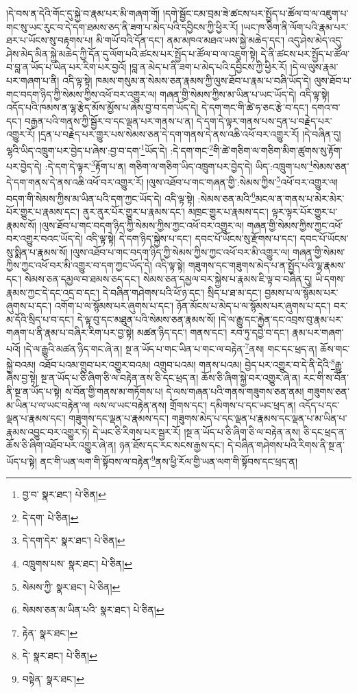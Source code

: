 །དེ་བས་ན་དེའི་གོང་དུ་སྐྱེ་བ་རྣམ་པར་མི་གཞག་གོ། །དགེ་སྦྱོང་ངམ་བྲམ་ཟེ་ཚངས་པར་སྤྱོད་པ་ཚོལ་བ་ལ་འཇུག་པ་གང་སུ་ཡང་རུང་བ་དེ་དག་ཐམས་ཅད་ནི་ཟག་པ་མེད་པའི་དབྱིངས་ཀྱི་ཕྱིར་རོ། །ཡང་ཁ་ཅིག་ནི་ལོག་པའི་རྣམ་པར་ཐར་པ་ཡོངས་སུ་བརྟགས་པ། མི་གཡོ་བའི་དོན་དང་། ནམ་མཁའ་མཐའ་ཡས་སྐྱེ་མཆེད་དང་། འདུ་ཤེས་མེད་འདུ་ཤེས་མེད་མིན་སྐྱེ་མཆེད་ཀྱི་དོན་དུ་ལོག་པའི་ཚངས་པར་སྤྱོད་པ་ཚོལ་བ་ལ་འཇུག་སྟེ། དེ་ནི་ཚངས་པར་སྤྱོད་པ་ཚོལ་བ་བླ་ན་ཡོད་པ་ཡིན་པར་རིག་པར་བྱའོ། །བླ་ན་མེད་པ་ནི་ཟག་པ་མེད་པའི་དབྱིངས་ཀྱི་ཕྱིར་རོ། །དེ་ལ་ལུས་རྣམ་པར་གཞག་པ་ནི། འདི་ལྟ་སྟེ། ཁམས་གསུམ་ན་སེམས་ཅན་རྣམས་ཀྱི་ལུས་ཐོབ་པ་རྣམ་པ་བཞི་ཡོད་དེ། ལུས་ཐོབ་པ་གང་བདག་ཉིད་ཀྱི་སེམས་ཀྱིས་འཕོ་བར་འགྱུར་ལ། གཞན་གྱི་སེམས་ཀྱིས་མ་ཡིན་པ་ཡང་ཡོད་དེ། འདི་ལྟ་སྟེ། འདོད་པའི་ཁམས་ན་ལྷ་རྩེད་མོས་མྱོས་པ་ཞེས་བྱ་བ་དག་ཡོད་དེ། དེ་དག་གང་གི་ཚེ་ཧ་ཅང་རྩེ་བ་དང་། དགའ་བ་དང་། བརྒྱན་པའི་གནས་ཀྱི་སྦྱོར་བ་དང་ལྡན་པར་གནས་པ་ན། དེ་དག་དེ་ལྟར་གནས་པས་དྲན་པ་བརྗེད་པར་འགྱུར་རོ། །དྲན་པ་བརྗེད་པར་གྱུར་པས་སེམས་ཅན་དེ་དག་གནས་དེ་ནས་འཆི་འཕོ་བར་འགྱུར་རོ། །དེ་བཞིན་དུ། ལྷའི་ཡིད་འཁྲུག་པར་བྱེད་པ་ཞེས་:བྱ་བ་དག་\footnote{བྱ་བ་  སྣར་ཐང་།  པེ་ཅིན། }ཡོད་དེ། :དེ་དག་གང་\footnote{དེ་དག་  པེ་ཅིན། }གི་ཚེ་གཅིག་ལ་གཅིག་མིག་ཚུགས་སུ་རྟོག་པར་བྱེད་དེ། :དེ་དག་དེ་ལྟར་\footnote{དེ་དག་དེར་  སྣར་ཐང་།  པེ་ཅིན། }རྟོག་པ་ན། གཅིག་ལ་གཅིག་ཡིད་འཁྲུག་པར་བྱེད་དེ། ཡིད་:འཁྲུག་པས་\footnote{འཁྲུགས་པས་  སྣར་ཐང་།  པེ་ཅིན། }སེམས་ཅན་དེ་དག་གནས་དེ་ནས་འཆི་འཕོ་བར་འགྱུར་རོ། །ལུས་འཐོབ་པ་གང་གཞན་གྱི་:སེམས་ཀྱིས་\footnote{སེམས་ཀྱི་  སྣར་ཐང་།  པེ་ཅིན། }འཕོ་བར་འགྱུར་ལ། བདག་གི་སེམས་ཀྱིས་མ་ཡིན་པའི་དག་ཀྱང་ཡོད་དེ། འདི་ལྟ་སྟེ། :སེམས་ཅན་མའི་\footnote{སེམས་ཅན་མ་ཡིན་པའི་  སྣར་ཐང་།  པེ་ཅིན། }མངལ་ན་གནས་པ་མེར་མེར་པོར་གྱུར་པ་རྣམས་དང་། ནུར་ནུར་པོར་གྱུར་པ་རྣམས་དང་། མཁྲང་གྱུར་པ་རྣམས་དང་། ལྟར་ལྟར་པོར་གྱུར་པ་རྣམས་སོ། །ལུས་ཐོབ་པ་གང་བདག་ཉིད་ཀྱི་སེམས་ཀྱིས་ཀྱང་འཕོ་བར་འགྱུར་ལ། གཞན་གྱི་སེམས་ཀྱིས་ཀྱང་འཕོ་བར་འགྱུར་བའང་ཡོད་དེ། འདི་ལྟ་སྟེ། དེ་དག་ཉིད་སྐྱེས་པ་དང་། དབང་པོ་ཡོངས་སུ་རྫོགས་པ་དང་། དབང་པོ་ཡོངས་སུ་སྨིན་པ་རྣམས་སོ། །ལུས་འཐོབ་པ་གང་བདག་ཉིད་ཀྱི་སེམས་ཀྱིས་ཀྱང་འཕོ་བར་མི་འགྱུར་ལ། གཞན་གྱི་སེམས་ཀྱིས་ཀྱང་འཕོ་བར་མི་འགྱུར་བ་དག་ཀྱང་ཡོད་དེ། འདི་ལྟ་སྟེ། གཟུགས་དང་གཟུགས་མེད་པ་ན་སྤྱོད་པའི་ལྷ་རྣམས་དང་། སེམས་ཅན་དམྱལ་བ་ཐམས་ཅད་དང་། སེམས་ཅན་དམྱལ་བར་སྐྱེས་པ་རྣམས་ཇི་ལྟ་བ་བཞིན་དུ། ཡི་དགས་རྣམས་ཀྱང་དེ་དང་འདྲ་བ་དང་། དེ་བཞིན་གཤེགས་པའི་ཕོ་ཉ་དང་། སྲིད་པ་ཐ་མ་དང་། བྱམས་པ་ལ་སྙོམས་པར་ཞུགས་པ་དང་། འགོག་པ་ལ་སྙོམས་པར་ཞུགས་པ་དང་། ཉོན་མོངས་པ་མེད་པ་ལ་སྙོམས་པར་ཞུགས་པ་དང་། བར་མ་དོའི་སྲིད་པ་བ་དང་། དེ་ལྟ་བུ་དང་མཐུན་པའི་སེམས་ཅན་རྣམས་སོ། །དེ་ལ་རྒྱུ་དང་རྐྱེན་དང་འབྲས་བུ་རྣམ་པར་གཞག་པ་ནི་རྣམ་པ་བཞིར་རིག་པར་བྱ་སྟེ། མཚན་ཉིད་དང་། གནས་དང་། རབ་ཏུ་དབྱེ་བ་དང་། རྣམ་པར་གཞག་པའོ། །དེ་ལ་རྒྱུའི་མཚན་ཉིད་གང་ཞེ་ན། སྔ་ན་ཡོད་པ་གང་ཡིན་པ་གང་ལ་བརྟེན་\footnote{རྟེན་  སྣར་ཐང་། }ནས། གང་དང་ཕྲད་ན། ཆོས་གང་སྐྱེ་བའམ། འཐོབ་པའམ་གྲུབ་པར་འགྱུར་བའམ། འགྲུབ་པའམ། གནས་པའམ། བྱེད་པར་འགྱུར་བ་དེ་ནི་དེའི་\footnote{དེ་  སྣར་ཐང་།  པེ་ཅིན། }རྒྱུ་ཞེས་བྱ་སྟེ། སྔ་ན་ཡོད་པ་ཅི་ཞིག་ཅི་ལ་བརྟེན་ནས་ཅི་དང་ཕྲད་ན། ཆོས་ཅི་ཞིག་སྐྱེ་བར་འགྱུར་ཞེ་ན། རང་གི་ས་བོན་ནི་སྔ་ན་ཡོད་པ་སྟེ། ས་བོན་གྱི་གནས་མ་གཏོགས་པ། དེ་ལས་གཞན་པའི་གནས་གཟུགས་ཅན་ནམ། གཟུགས་ཅན་མ་ཡིན་པ་ལ་ཡང་བརྟེན་ལ། ལས་ལ་ཡང་བརྟེན་ནས། གྲོགས་དང་། དམིགས་པ་དང་ཡང་ཕྲད་ན། འདོད་པ་དང་ལྡན་པ་རྣམས་དང་། གཟུགས་དང་ལྡན་པ་རྣམས་དང་། གཟུགས་མེད་པ་དང་ལྡན་པ་རྣམས་དང་ལྡན་པ་མ་ཡིན་པ་རྣམས་འབྱུང་བར་འགྱུར་ཏེ། དེ་ཡང་ཅི་རིགས་པར་སྦྱར་རོ། །སྔ་ན་ཡོད་པ་ཅི་ཞིག་ཅི་ལ་བརྟེན་ནས། ཅི་དང་ཕྲད་ན་ཆོས་ཅི་ཞིག་འཐོབ་པར་འགྱུར་ཞེ་ན། ཉན་ཐོས་དང་རང་སངས་རྒྱས་དང་། དེ་བཞིན་གཤེགས་པའི་རིགས་ནི་སྔ་ན་ཡོད་པ་སྟེ། ནང་གི་ཡན་ལག་གི་སྟོབས་ལ་བརྟེན་\footnote{བསྟེན་  སྣར་ཐང་། }ནས་ཕྱི་རོལ་གྱི་ཡན་ལག་གི་སྟོབས་དང་ཕྲད་ན། 